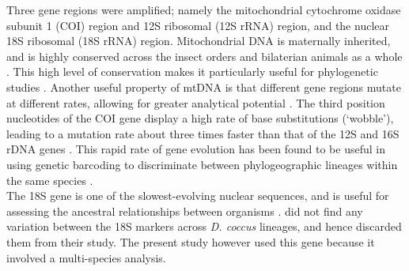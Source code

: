 Three gene regions were amplified; namely the mitochondrial cytochrome oxidase subunit 1 (COI) region and 12S ribosomal (12S rRNA) region, and the nuclear 18S ribosomal (18S rRNA) region. 
Mitochondrial DNA is maternally inherited, and is highly conserved across the insect orders and bilaterian animals as a whole \citep{Hoy2013, Cameron2014InsectPhylogeny}. This high level of conservation makes it particularly useful for phylogenetic studies \citep{Lunt1996, Hoy2013, DeMandal2014}. Another useful property of mtDNA is that different gene regions mutate at different rates, allowing for greater analytical potential \citep{Hoy2013}. 
The third position nucleotides of the COI gene display a high rate of base substitutions (`wobble'), leading to a mutation rate about three times faster than that of the 12S and 16S rDNA genes \citep{Knowlton1998}. This rapid rate of gene evolution has been found to be useful in using genetic barcoding to discriminate between phylogeographic lineages within the same species \citep{Cox2001, Gentekaki2012}. \\
The 18S gene is one of the slowest-evolving nuclear sequences, and is useful for assessing the ancestral relationships between organisms \citep{Hillis1991}. \citet{Campana2015} did not find any variation between the 18S markers across \textit{D. coccus} lineages, and hence discarded them from their study. The present study however used this gene because it involved a multi-species analysis.

